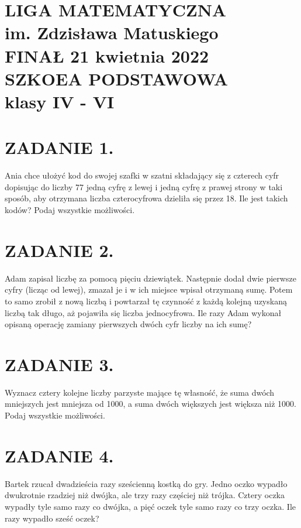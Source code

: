 \documentclass[10pt]{article}
\begin{document}
\section*{LIGA MATEMATYCZNA \\
 im. Zdzisława Matuskiego \\
 FINAŁ 21 kwietnia 2022 \\
 SZKOEA PODSTAWOWA \\
 klasy IV - VI}
\section*{ZADANIE 1.}
Ania chce ułożyć kod do swojej szafki w szatni składający się z czterech cyfr dopisując do liczby 77 jedną cyfrę z lewej i jedną cyfrę z prawej strony w taki sposób, aby otrzymana liczba czterocyfrowa dzieliła się przez 18. Ile jest takich kodów? Podaj wszystkie możliwości.

\section*{ZADANIE 2.}
Adam zapisał liczbę za pomocą pięciu dziewiątek. Następnie dodał dwie pierwsze cyfry (licząc od lewej), zmazał je i w ich miejsce wpisał otrzymaną sumę. Potem to samo zrobił z nową liczbą i powtarzał tę czynność z każdą kolejną uzyskaną liczbą tak długo, aż pojawiła się liczba jednocyfrowa. Ile razy Adam wykonał opisaną operację zamiany pierwszych dwóch cyfr liczby na ich sumę?

\section*{ZADANIE 3.}
Wyznacz cztery kolejne liczby parzyste mające tę własność, że suma dwóch mniejszych jest mniejsza od 1000, a suma dwóch większych jest większa niż 1000. Podaj wszystkie możliwości.

\section*{ZADANIE 4.}
Bartek rzucał dwadzieścia razy sześcienną kostką do gry. Jedno oczko wypadło dwukrotnie rzadziej niż dwójka, ale trzy razy częściej niż trójka. Cztery oczka wypadły tyle samo razy co dwójka, a pięć oczek tyle samo razy co trzy oczka. Ile razy wypadło sześć oczek?
\end{document}
